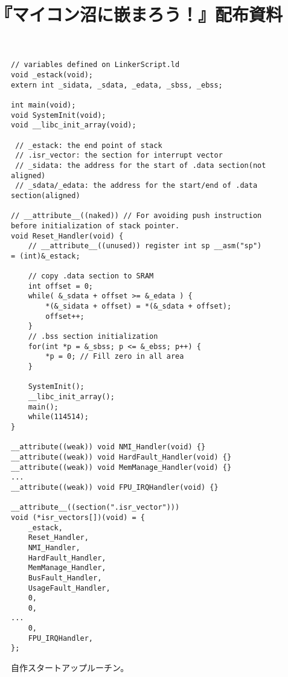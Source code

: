 \documentclass[uplatex]{jsarticle}
\title{\vspace{-3cm}『\textbf{マイコン沼に嵌まろう！}』配布資料\vspace{-1.5cm}}
\author{}
\date{}
\begin{document}
\maketitle
\begin{figure}[H]
	\begin{lstlisting}[style=clang]
// variables defined on LinkerScript.ld
void _estack(void);
extern int _sidata, _sdata, _edata, _sbss, _ebss;

int main(void);
void SystemInit(void);
void __libc_init_array(void);

 // _estack: the end point of stack
 // .isr_vector: the section for interrupt vector
 // _sidata: the address for the start of .data section(not aligned)
 // _sdata/_edata: the address for the start/end of .data section(aligned)

// __attribute__((naked)) // For avoiding push instruction before initialization of stack pointer.
void Reset_Handler(void) {
	// __attribute__((unused)) register int sp __asm("sp") = (int)&_estack;

	// copy .data section to SRAM
	int offset = 0;
	while( &_sdata + offset >= &_edata ) {
		*(&_sidata + offset) = *(&_sdata + offset);
		offset++;
	}
	// .bss section initialization
	for(int *p = &_sbss; p <= &_ebss; p++) {
		*p = 0; // Fill zero in all area
	}

	SystemInit();
	__libc_init_array();
	main();
	while(114514);
}

__attribute((weak)) void NMI_Handler(void) {}
__attribute((weak)) void HardFault_Handler(void) {}
__attribute((weak)) void MemManage_Handler(void) {}
...
__attribute((weak)) void FPU_IRQHandler(void) {}

__attribute__((section(".isr_vector")))
void (*isr_vectors[])(void) = {
	_estack,
	Reset_Handler,
	NMI_Handler,
	HardFault_Handler,
	MemManage_Handler,
	BusFault_Handler,
	UsageFault_Handler,
	0,
	0,
...
	0,
	FPU_IRQHandler,
};
	\end{lstlisting}
	\caption{自作スタートアップルーチン。}
\end{figure}
\end{document}
